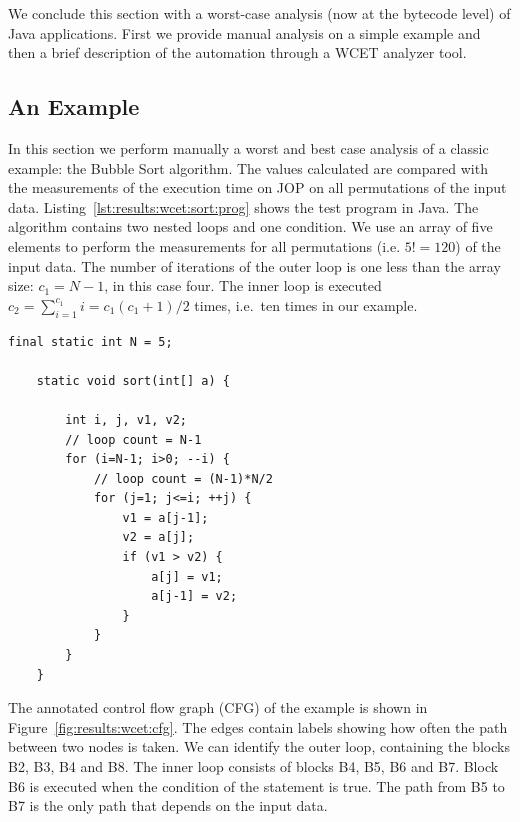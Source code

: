 We conclude this section with a worst-case analysis (now at the
bytecode level) of Java applications. First we provide manual
analysis on a simple example and then a brief description of the
automation through a WCET analyzer tool.

\subsection{An Example} \label{subsec:wcet:eval}


In this section we perform manually a worst and best case analysis of
a classic example: the Bubble Sort algorithm. The values calculated
are compared with the measurements of the execution time on JOP on
all permutations of the input data.
Listing~\ref{lst:results:wcet:sort:prog} shows the test program in
Java. The algorithm contains two nested loops and one condition. We
use an array of five elements to perform the measurements for all
permutations (i.e. $5!=120$) of the input data. The number of
iterations of the outer loop is one less than the array size:
$c_1=N-1$, in this case four. The inner loop is executed $c_2 =
\sum_{i=1}^{c_1}i = c_1(c_1+1)/2$ times, i.e.\ ten times in our
example.


\begin{lstlisting}[float,caption={Bubble Sort test program for the WCET analysis},
label=lst:results:wcet:sort:prog]
    final static int N = 5;

    static void sort(int[] a) {

        int i, j, v1, v2;
        // loop count = N-1
        for (i=N-1; i>0; --i) {
            // loop count = (N-1)*N/2
            for (j=1; j<=i; ++j) {
                v1 = a[j-1];
                v2 = a[j];
                if (v1 > v2) {
                    a[j] = v1;
                    a[j-1] = v2;
                }
            }
        }
    }
\end{lstlisting}

The annotated control flow graph (CFG) of the example is shown in
Figure~\ref{fig:results:wcet:cfg}. The edges contain labels showing
how often the path between two nodes is taken. We can identify the
outer loop, containing the blocks B2, B3, B4 and B8. The inner loop
consists of blocks B4, B5, B6 and B7. Block B6 is executed when the
condition of the  statement is true. The path from B5 to B7
is the only path that depends on the input data.


